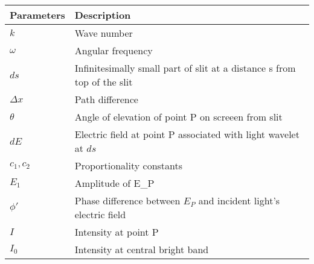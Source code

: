 \begin{tabular}{|p{2.5cm}|p{5.5cm}|}
\hline
\textbf{Parameters} & \textbf{Description} \\
\hline
$k$ & Wave number\\
\hline
$\omega$ & Angular frequency\\
\hline
$ds$ & Infinitesimally small part of slit at a distance s from top of the slit\\
\hline
$\Delta x$ & Path difference\\
\hline
$\theta$ & Angle of elevation of point P on screeen from slit\\
\hline
$dE$& Electric field at point P associated with light wavelet at $ds$\\
\hline
$c_1, c_2$ & Proportionality constants \\
\hline
$E_1$ & Amplitude of E_P\\
\hline
$\phi' $ & Phase difference between $E_P$ and incident light's electric field\\
\hline
$I$& Intensity at point P\\
\hline
$I_0$ & Intensity at central bright band\\
\hline
\end{tabular}
